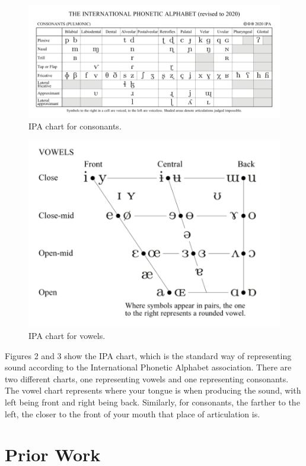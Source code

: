 \documentclass[10pt,twocolumn]{article}
\begin{document}
\begin{figure}
    \centering
    \includegraphics[width=.95\linewidth]{consonant.png}
    \caption{
        IPA chart for consonants.
    }
    \label{fig:first-page}
\end{figure}

\begin{figure}
    \centering
    \includegraphics[width=.95\linewidth]{vowel.png}
    \caption{
        IPA chart for vowels.
    }
    \label{fig:first-page}
\end{figure}

Figures 2 and 3 show the IPA chart, which is the standard way of representing sound according to the International Phonetic Alphabet association. There are two different charts, one representing vowels and one representing consonants. The vowel chart represents where your tongue is when producing the sound, with left being front and right being back. Similarly, for consonants, the farther to the left, the closer to the front of your mouth that place of articulation is.


\section{Prior Work}
\end{document}
